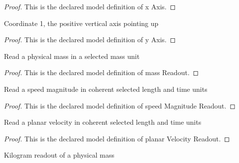 \begin{proof}
  This is the declared model definition of x Axis.
\end{proof}
\begin{definition}[y Axis]
  \label{def:physics:phyx-mini-0816:phyxminiproblems-problemphyxmini0816-yaxis}
  Coordinate 1, the positive vertical axis pointing up
\end{definition}
\begin{proof}
  This is the declared model definition of y Axis.
\end{proof}
\begin{definition}
  \label{def:physics:phyx-mini-0816:phyxminiproblems-problemphyxmini0816-massreadout}
  Read a physical mass in a selected mass unit
\end{definition}
\begin{proof}
  This is the declared model definition of mass Readout.
\end{proof}
\begin{definition}
  \label{def:physics:phyx-mini-0816:phyxminiproblems-problemphyxmini0816-speedmagnitudereadout}
  Read a speed magnitude in coherent selected length and time units
\end{definition}
\begin{proof}
  This is the declared model definition of speed Magnitude Readout.
\end{proof}
\begin{definition}
  \label{def:physics:phyx-mini-0816:phyxminiproblems-problemphyxmini0816-planarvelocityreadout}
  Read a planar velocity in coherent selected length and time units
\end{definition}
\begin{proof}
  This is the declared model definition of planar Velocity Readout.
\end{proof}
\begin{definition}
  \label{def:physics:phyx-mini-0816:phyxminiproblems-problemphyxmini0816-massinkilograms}
  Kilogram readout of a physical mass
\end{definition}
